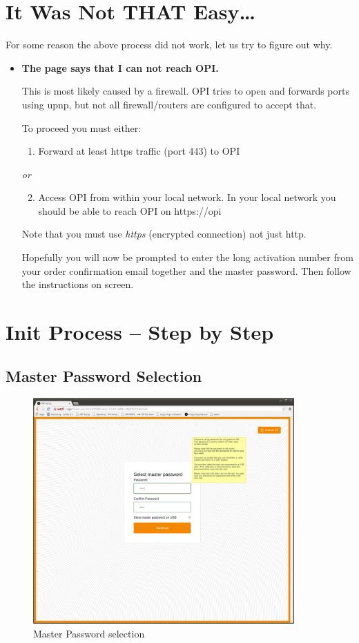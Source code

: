 \documentclass[12pt,a4paper,titlepage]{article}
\begin{document}
\FloatBarrier
\newpage
\section{It Was Not THAT Easy\ldots}
For some reason the above process did not work, let us try to figure out why.
\begin{itemize}
\item \textbf{The page says that I can not reach OPI.}

This is most likely caused by a firewall. OPI tries to open and forwards ports using upnp, but not all firewall/routers are configured to accept that.

To proceed you must either:
\begin{enumerate}
\item Forward at least https traffic (port 443) to OPI
\end{enumerate}
\emph{or}
\begin{enumerate}
\setcounter{enumi}{1}
\item Access OPI from within your local network. In your local network you should be able to reach OPI on https://opi
\end{enumerate}

Note that you must use \emph{https} (encrypted connection) not just http.

Hopefully you will now be prompted to enter the long activation number from your order confirmation email together and the master password.
Then follow the instructions on screen.
\end{itemize}
\FloatBarrier
\newpage
\section{Init Process – Step by Step}
\subsection{Master Password Selection}
\begin{figure}[h!]
\centering
\includegraphics[width=10cm]{./img/master_pwd}
\caption{Master Password selection}
\end{figure}
\end{document}
